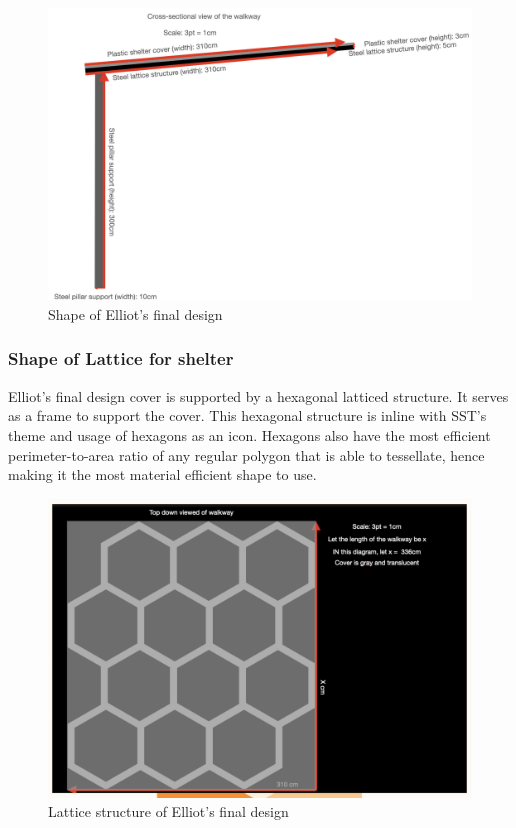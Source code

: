 \documentclass[a4paper,titlepage]{article}
\begin{document}
\begin{figure}[htbp]
    \centering
    \includegraphics[width=\textwidth]{elliotDesign1.png}
    \caption{Shape of Elliot's final design}
    \label{fig:elliotDesign1}
\end{figure}

\subsubsection{Shape of Lattice for shelter}

Elliot's final design cover is supported by a hexagonal latticed structure. It serves as a frame to support the cover. This hexagonal structure is inline with SST’s theme and usage of hexagons as an icon. Hexagons also have the most efficient perimeter-to-area ratio of any regular polygon that is able to tessellate, hence making it the most material efficient shape to use. 

\begin{figure}[htbp]
    \centering
    \includegraphics[width=\textwidth]{elliotDesign2.png}
    \caption{Lattice structure of Elliot's final design}
    \label{fig:elliotDesign2}
\end{figure}
\end{document}
